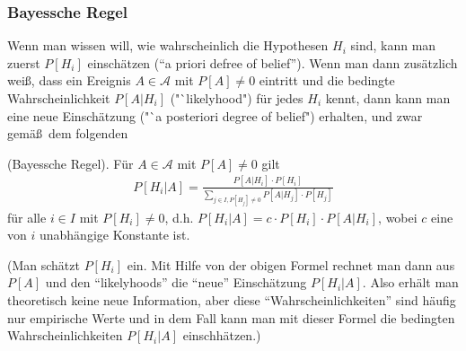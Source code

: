 \subsubsection{Bayessche Regel}
Wenn man wissen will, wie wahrscheinlich die Hypothesen $H_i$ sind, kann man
zuerst $P[H_i]$ einsch\"atzen ("`a priori defree of belief"'). Wenn man dann
zus\"atzlich wei\ss , dass ein Ereignis $A \in \mathcal{A}$ mit $P[A] \neq 0$
eintritt und die bedingte Wahrscheinlichkeit $P[A|H_i]$ ("`likelyhood") f\"ur
jedes $H_i$ kennt, dann kann man eine neue Einsch\"atzung ("`a posteriori
degree of belief") erhalten, und zwar gem\"a\ss\ dem folgenden

\begin{korollar} (Bayessche Regel). F\"ur $A \in \mathcal{A}$ mit $P[A] \neq 0$
gilt
\begin{eqnarray}
P[H_i|A] = \frac{P[A|H_i] \cdot P[H_i]}{\sum_{j \in I, P[H_j] \neq 0} P[A|H_j]
\cdot P[H_j]} \nonumber
\end{eqnarray}
f\"ur alle $i \in I$ mit $P[H_i] \neq 0$, d.h. $P[H_i|A]=c \cdot P[H_i] \cdot
P[A|H_i]$, wobei $c$ eine von $i$ unabh\"angige Konstante ist.
\end{korollar}

(Man sch\"atzt $P[H_i]$ ein. Mit Hilfe von der obigen Formel rechnet man dann
aus $P[A]$ und den "`likelyhoods"' die "`neue"' Einsch\"atzung $P[H_i|A]$. Also
erh\"alt man theoretisch keine neue Information, aber diese
"`Wahrscheinlichkeiten"' sind h\"aufig nur empirische Werte und in dem Fall
kann man mit dieser Formel die bedingten Wahrscheinlichkeiten $P[H_i|A]$
einschh\"atzen.)
